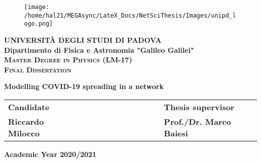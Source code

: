 \documentclass[a4paper,11pt,twoside]{report} %
\begin{document}

\begin{titlepage}
\vspace{5mm}
\begin{figure}[hbtp]
\centering
\texttt{[image: /home/hal21/MEGAsync/LateX\_Docs/NetSciThesis/Images/unipd\_logo.png]}
\end{figure}
\vspace{5mm}
\begin{center}
{{\huge{\textsc{\bf UNIVERSIT\`A DEGLI STUDI DI PADOVA}}}\\}
\vspace{5mm}
{\Large{\bf Dipartimento di Fisica e Astronomia "Galileo Galilei"}} \\
\vspace{5mm}
{\Large{\textsc{\bf Master Degree in Physics (LM-17)}}}\\
\vspace{20mm}
{\Large{\textsc{\bf Final Dissertation}}}\\
\vspace{30mm}
\begin{spacing}{3}
{\LARGE \textbf{Modelling COVID-19 spreading in a network}}\\
\end{spacing}
\vspace{8mm}
\end{center}

\vspace{20mm}
\begin{spacing}{2}
\begin{tabular}{ l  c  c c c  cc c c c c  l }
{\Large{\bf Candidate}} &&&&&&&&&&& {\Large{\bf Thesis supervisor}}\\
{\Large{\bf Riccardo Milocco}} &&&&&&&&&&& {\Large{\bf Prof./Dr. Marco Baiesi}}\\
\end{tabular}
\end{spacing}
\vspace{15 mm}

\begin{center}
{\Large{\bf Academic Year 2020/2021}}
\end{center}
\end{titlepage}

\restoregeometry

\clearpage{\pagestyle{empty}\cleardoublepage}

\pagestyle{empty}
\end{document}
